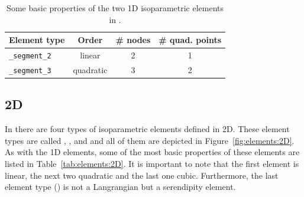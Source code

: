 \begin{table}[!htb]
\begin{center}
\begin{tabular}{l|ccc}
\toprule
Element type & Order & \# nodes & \# quad. points \\
\midrule
\texttt{\_segment\_2} & linear & 2 & 1 \\
\texttt{\_segment\_3} & quadratic & 3 & 2 \\
\bottomrule
\end{tabular}
\end{center}
\caption{Some basic properties of the two 1D isoparametric elements in \akantu.}
\label{tab:elements:1D}
\end{table}

\subsection*{2D}

In \akantu there are four types of isoparametric elements defined in 2D. These element types are called , ,  and  and all of them are depicted in Figure~\ref{fig:elements:2D}. As with the 1D elements, some of the most basic properties of these elements are listed in Table~\ref{tab:elements:2D}. It is important to note that the first element is linear, the next two quadratic and the last one cubic. Furthermore, the last element type () is not a Langrangian but a serendipity element.

